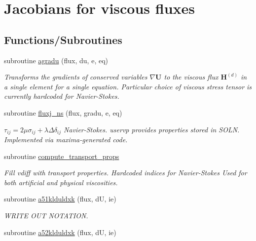 \hypertarget{group__vfjac}{\section{Jacobians for viscous fluxes}
\label{group__vfjac}
}
\subsection*{Functions/\-Subroutines}
\begin{DoxyCompactItemize}
\item 
subroutine \hyperlink{group__vfjac_ga9087d56c6c467d3ffeb9aa6be3f43e82}{agradu} (flux, du, e, eq)
\begin{DoxyCompactList}\small\item\em Transforms the gradients of conserved variables $\nabla \mathbf{U}$ to the viscous flux $\mathbf{H}^{(d)}$ in a single element for a single equation. Particular choice of viscous stress tensor is currently hardcoded for Navier-\/\-Stokes. \end{DoxyCompactList}\item 
subroutine \hyperlink{group__vfjac_ga2c0d85531a9af69b9d464571ca530e5d}{fluxj\-\_\-ns} (flux, gradu, e, eq)
\begin{DoxyCompactList}\small\item\em $ \tau_{ij}=2 \mu\sigma_{ij} + \lambda \Delta \delta_{ij}$ Navier-\/\-Stokes. uservp provides properties stored in S\-O\-L\-N. Implemented via maxima-\/generated code. \end{DoxyCompactList}\item 
subroutine \hyperlink{group__vfjac_ga15f8f8f0e3d305dc065f004aa09de57c}{compute\-\_\-transport\-\_\-props}
\begin{DoxyCompactList}\small\item\em Fill vdiff with transport properties. Hardcoded indices for Navier-\/\-Stokes Used for both artificial and physical viscosities. \end{DoxyCompactList}\item 
\hypertarget{group__vfjac_ga34cccfbb67ddce8c68e7f2742a94af96}{subroutine \hyperlink{group__vfjac_ga34cccfbb67ddce8c68e7f2742a94af96}{a51klduldxk} (flux, d\-U, ie)}\label{group__vfjac_ga34cccfbb67ddce8c68e7f2742a94af96}

\begin{DoxyCompactList}\small\item\em W\-R\-I\-T\-E O\-U\-T N\-O\-T\-A\-T\-I\-O\-N. \end{DoxyCompactList}\item 
\hypertarget{group__vfjac_gad8d6f5b90772f9f1082fba425cece421}{subroutine \hyperlink{group__vfjac_gad8d6f5b90772f9f1082fba425cece421}{a52klduldxk} (flux, d\-U, ie)}\label{group__vfjac_gad8d6f5b90772f9f1082fba425cece421}


\end{DoxyCompactItemize}
